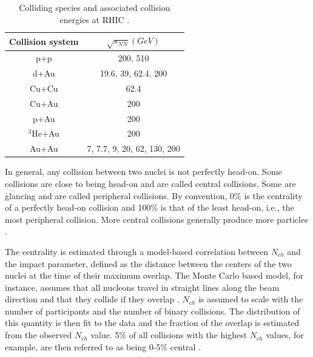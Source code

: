 \begin{table}[h!]
\centering
\begin{tabular}{||c c||}
\hline
Collision system & $\sqrt{s_{NN}}(GeV)$ \\ [0.5ex]
\hline
\hline
p+p & 200, 510 \\
d+Au & 19.6, 39, 62.4, 200 \\
Cu+Cu & 62.4 \\
Cu+Au &  200 \\
p+Au & 200 \\
$^3$He+Au & 200 \\
Au+Au & 7, 7.7, 9, 20, 62, 130, 200 \\ [1ex]
\hline
\end{tabular}
\caption{Colliding species and associated collision energies at RHIC \cite{McGlincheyPrivateCommunication}.}
\label{table:RHIC_specs}
\end{table}


In general, any collision between two nuclei is not perfectly head-on. Some collisions are close to being head-on and are called central collisions. Some are glancing and are called peripheral collisions. %
By convention, 0\% is the centrality of a perfectly head-on collision and 100\% is that of the least head-on, i.e., the most peripheral collision. More central collisions generally produce more particles \cite{Connors:2017ptx}.

The centrality is estimated through a model-based correlation between $N_{ch}$ and the impact parameter, defined as the distance between the centers of the two nuclei at the time of their maximum overlap. The Monte Carlo based model, for instance, assumes that all nucleons travel in straight lines along the beam direction \cite{Loizides:2014vua} and that they collide if they overlap \cite{Miller:2007ri}. $N_{ch}$ is assumed to scale with the number of participants and the number of binary collisions. The distribution of this quantity is then fit to the data and the fraction of the overlap is estimated from the observed $N_{ch}$ value. 5\% of all collisions with the highest $N_{ch}$ values, for example, are then referred to as being 0-5\% central \cite{Connors:2017ptx}.

